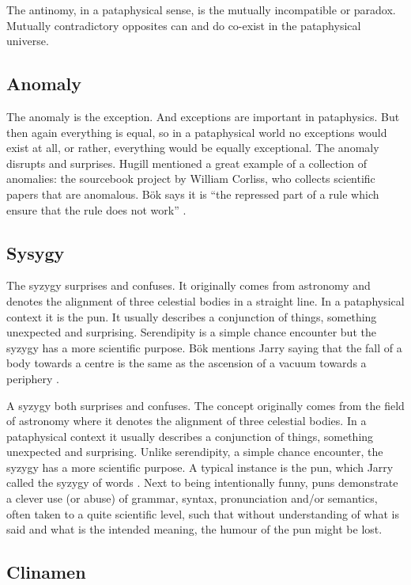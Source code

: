 The antinomy, in a pataphysical sense, is the mutually incompatible or paradox. Mutually contradictory opposites can and do co-exist in the pataphysical universe.


\subsection{Anomaly}

The anomaly is the exception. And exceptions are important in pataphysics. But then again everything is equal, so in a pataphysical world no exceptions would exist at all, or rather, everything would be equally exceptional. The anomaly disrupts and surprises. Hugill mentioned a great example of a collection of anomalies: the sourcebook project by William Corliss, who collects scientific papers that are anomalous. Bök says it is ``the repressed part of a rule which ensure that the rule does not work'' \autocite[p.38]{Boek2002}.


\subsection{Sysygy}

The syzygy surprises and confuses. It originally comes from astronomy and denotes the alignment of three celestial bodies in a straight line. In a pataphysical context it is the pun. It usually describes a conjunction of things, something unexpected and surprising. Serendipity is a simple chance encounter but the syzygy has a more scientific purpose. Bök mentions Jarry saying that the fall of a body towards a centre is the same as the ascension of a vacuum towards a periphery \autocite[p.42]{Boek2002}.

A syzygy both surprises and confuses. The concept originally comes from the field of astronomy where it denotes the alignment of three celestial bodies. In a pataphysical context it usually describes a conjunction of things, something unexpected and surprising. Unlike serendipity, a simple chance encounter, the syzygy has a more scientific purpose. A typical instance is the pun, which Jarry called the syzygy of words \autocite{Jarry1996}. Next to being intentionally funny, puns demonstrate a clever use (or abuse) of grammar, syntax, pronunciation and/or semantics, often taken to a quite scientific level, such that without understanding of what is said and what is the intended meaning, the humour of the pun might be lost.


\subsection{Clinamen}

